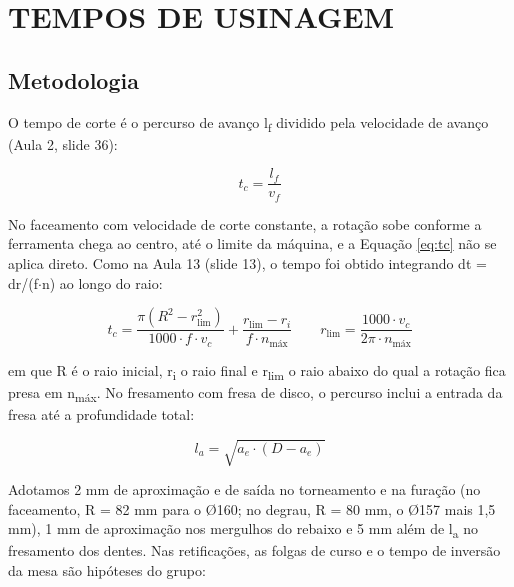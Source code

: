 \chapter{TEMPOS DE USINAGEM}

\section{Metodologia}

O tempo de corte é o percurso de avanço l\textsubscript{f} dividido pela velocidade de avanço (Aula 2, slide 36):

\begin{equation}\label{eq:tc}
  t_{c} = \frac{l_{f}}{v_{f}}
\end{equation}

No faceamento com velocidade de corte constante, a rotação sobe conforme a ferramenta chega ao centro, até o limite da máquina, e a Equação \eqref{eq:tc} não se aplica direto. Como na Aula 13 (slide 13), o tempo foi obtido integrando dt = dr/(f$\cdot$n) ao longo do raio:

\begin{equation}\label{eq:tface}
  t_{c} = \frac{\pi \left( R^{2} - r_{\text{lim}}^{2} \right)}{1000 \cdot f \cdot v_{c}} + \frac{r_{\text{lim}} - r_{i}}{f \cdot n_{\text{máx}}} \qquad r_{\text{lim}} = \frac{1000 \cdot v_{c}}{2 \pi \cdot n_{\text{máx}}}
\end{equation}

em que R é o raio inicial, r\textsubscript{i} o raio final e r\textsubscript{lim} o raio abaixo do qual a rotação fica presa em n\textsubscript{máx}. No fresamento com fresa de disco, o percurso inclui a entrada da fresa até a profundidade total:

\begin{equation}\label{eq:la}
  l_{a} = \sqrt{a_{e} \cdot \left( D - a_{e} \right)}
\end{equation}

Adotamos 2 mm de aproximação e de saída no torneamento e na furação (no faceamento, R = 82 mm para o Ø160; no degrau, R = 80 mm, o Ø157 mais 1,5 mm), 1 mm de aproximação nos mergulhos do rebaixo e 5 mm além de l\textsubscript{a} no fresamento dos dentes. Nas retificações, as folgas de curso e o tempo de inversão da mesa são hipóteses do grupo:

